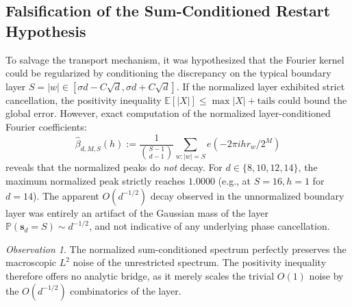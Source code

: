 \documentclass[12pt,a4paper]{article}
\theoremstyle{remark}
\newtheorem{observation}[theorem]{Observation}
\begin{document}
\subsection{Falsification of the Sum-Conditioned Restart Hypothesis}
To salvage the transport mechanism, it was hypothesized that the Fourier kernel could be
regularized by conditioning the discrepancy on the typical boundary layer
$S = |w| \in [\sigma d - C\sqrt{d}, \sigma d + C\sqrt{d}]$. If the normalized layer
exhibited strict cancellation, the positivity inequality $\mathbb{E}[|X|] \le \max|X| + \text{tails}$
could bound the global error.
However, exact computation of the normalized layer-conditioned Fourier coefficients:
\[
\widehat\beta_{d,M,S}(h) := \frac{1}{\binom{S-1}{d-1}} \sum_{w: |w|=S} e(-2\pi i h r_w/2^M)
\]
reveals that the normalized peaks do \emph{not} decay. For $d \in \{8, 10, 12, 14\}$, the maximum
normalized peak strictly reaches $1.0000$ (e.g., at $S=16, h=1$ for $d=14$).
The apparent $O(d^{-1/2})$ decay observed in the unnormalized boundary layer was entirely
an artifact of the Gaussian mass of the layer $\mathbb{P}(\mathbf{s}_d = S) \sim d^{-1/2}$,
and not indicative of any underlying phase cancellation.
\begin{observation}
The normalized sum-conditioned spectrum perfectly preserves the macroscopic $L^2$ noise
of the unrestricted spectrum. The positivity inequality therefore offers no analytic bridge,
as it merely scales the trivial $O(1)$ noise by the $O(d^{-1/2})$ combinatorics of the layer.
\end{observation}
\end{document}
